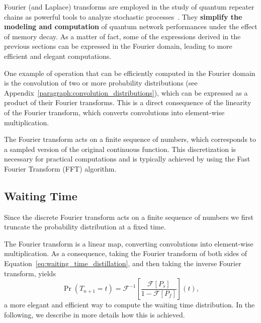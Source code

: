 \documentclass{masterthesis}
\begin{document}
Fourier (and Laplace) transforms are employed in the study of quantum repeater chains as powerful tools to analyze stochastic processes~\cite{Kuzmin_2021}. They \textbf{simplify the modeling and computation} of quantum network performances under the effect of memory decay.
As a matter of fact, some of the expressions derived in the previous sections can be expressed in the Fourier domain, leading to more efficient and elegant computations.

One example of operation that can be efficiently computed in the Fourier domain is the convolution of two or more probability distributions (see Appendix~\ref{paragraph:convolution_distributions}), which can be expressed as a product of their Fourier transforms. This is a direct consequence of the linearity of the Fourier transform, which converts convolutions into element-wise multiplication.

The Fourier transform acts on a finite sequence of numbers, which corresponds to a sampled version of the original continuous function. This discretization is necessary for practical computations and is typically achieved by using the Fast Fourier Transform (FFT) algorithm. 


\subsection{Waiting Time}

Since the discrete Fourier transform acts on a finite sequence of numbers we first truncate the probability distribution at a fixed time.

The Fourier transform is a linear map, converting convolutions into element-wise multiplication. As a consequence, taking the Fourier transform of both sides of Equation~\ref{eq:waiting_time_distillation}, and then taking the inverse Fourier transform, yields
\begin{equation}\label{eq:waiting_time_distillation_fourier}
    \Pr(T_{n+1} = t) = \mathcal{F}^{-1} \left[ \frac{\mathcal{F}[P_s]}{1 - \mathcal{F}[P_f]} \right](t) ,
\end{equation}
a more elegant and efficient way to compute the waiting time distribution.
In the following, we describe in more details how this is achieved.
\end{document}
